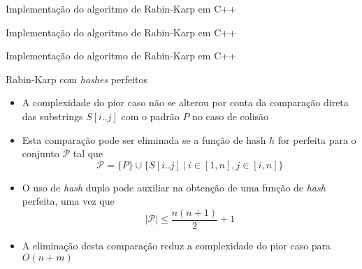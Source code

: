 %

\begin{frame}[fragile]{Implementação do algoritmo de Rabin-Karp em C++}
\end{frame}

\begin{frame}[fragile]{Implementação do algoritmo de Rabin-Karp em C++}
\end{frame}

\begin{frame}[fragile]{Implementação do algoritmo de Rabin-Karp em C++}
\end{frame}


\begin{frame}[fragile]{Rabin-Karp com {\it hashes} perfeitos}

    \begin{itemize}
        \item A complexidade do pior caso não se alterou por conta da comparação direta das
            substrings $S[i..j]$ com o padrão $P$ no caso de colisão
        \pause

        \item Esta comparação pode ser eliminada se a função de hash $h$ for perfeita para 
            o conjunto $\mathcal{P}$ tal que
        \[
            \mathcal{P} = \lbrace P \rbrace \cup \lbrace S[i..j]\ |\ i\in [1,n], j\in [i,n]\rbrace
        \]
        \pause

        \item O uso de \textit{hash} duplo pode auxiliar na obtenção de uma função de
            \textit{hash} perfeita, uma vez que
            \[
                |\mathcal{P}| \leq \dfrac{n(n + 1)}{2} + 1
            \]
        \pause
 
        \item A eliminação desta comparação reduz a complexidade do pior caso para 
            $O(n + m)$
    \end{itemize}

\end{frame}

